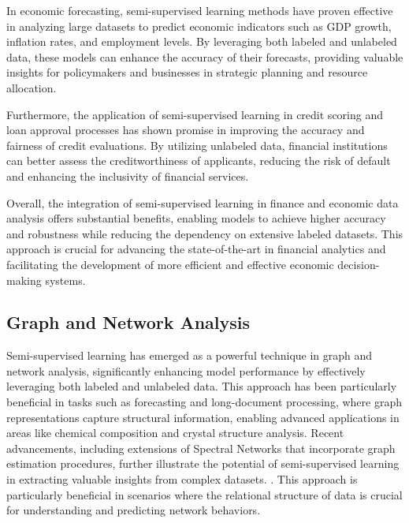 In economic forecasting, semi-supervised learning methods have proven effective in analyzing large datasets to predict economic indicators such as GDP growth, inflation rates, and employment levels. By leveraging both labeled and unlabeled data, these models can enhance the accuracy of their forecasts, providing valuable insights for policymakers and businesses in strategic planning and resource allocation.



Furthermore, the application of semi-supervised learning in credit scoring and loan approval processes has shown promise in improving the accuracy and fairness of credit evaluations. By utilizing unlabeled data, financial institutions can better assess the creditworthiness of applicants, reducing the risk of default and enhancing the inclusivity of financial services.



Overall, the integration of semi-supervised learning in finance and economic data analysis offers substantial benefits, enabling models to achieve higher accuracy and robustness while reducing the dependency on extensive labeled datasets. This approach is crucial for advancing the state-of-the-art in financial analytics and facilitating the development of more efficient and effective economic decision-making systems.



\subsection{Graph and Network Analysis} \label{subsec:Graph and Network Analysis}

Semi-supervised learning has emerged as a powerful technique in graph and network analysis, significantly enhancing model performance by effectively leveraging both labeled and unlabeled data. This approach has been particularly beneficial in tasks such as forecasting and long-document processing, where graph representations capture structural information, enabling advanced applications in areas like chemical composition and crystal structure analysis. Recent advancements, including extensions of Spectral Networks that incorporate graph estimation procedures, further illustrate the potential of semi-supervised learning in extracting valuable insights from complex datasets. \cite{ginzburg2021selfsuperviseddocumentsimilarityranking,ullah2019graphconvolutionalnetworksanalysis,shinji2024learningattributedgraphletspredictive}. This approach is particularly beneficial in scenarios where the relational structure of data is crucial for understanding and predicting network behaviors.



